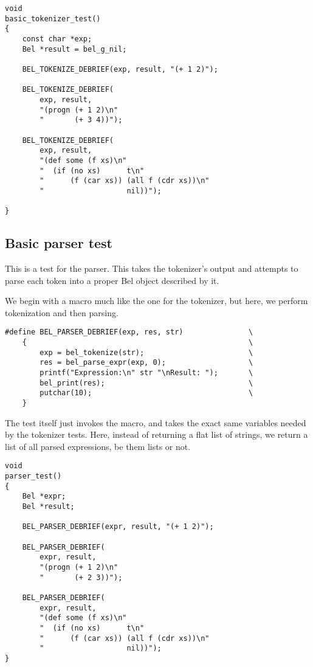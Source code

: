 \documentclass[openright,a4paper,twoside,12pt]{memoir}
\begin{document}
\begin{verbatim}
void
basic_tokenizer_test()
{
    const char *exp;
    Bel *result = bel_g_nil;

    BEL_TOKENIZE_DEBRIEF(exp, result, "(+ 1 2)");

    BEL_TOKENIZE_DEBRIEF(
        exp, result,
        "(progn (+ 1 2)\n"
        "       (+ 3 4))");

    BEL_TOKENIZE_DEBRIEF(
        exp, result,
        "(def some (f xs)\n"
        "  (if (no xs)      t\n"
        "      (f (car xs)) (all f (cdr xs))\n"
        "                   nil))");

}
\end{verbatim}

\subsection{Basic parser test}
\label{sec:orgd0c7366}

This is a  test for the parser. This takes  the tokenizer's output and
attempts to  parse each token  into a  proper Bel object  described by
it.

We begin with a  macro much like the one for  the tokenizer, but here,
we perform tokenization and then parsing.

\begin{verbatim}
#define BEL_PARSER_DEBRIEF(exp, res, str)               \
    {                                                   \
        exp = bel_tokenize(str);                        \
        res = bel_parse_expr(exp, 0);                   \
        printf("Expression:\n" str "\nResult: ");       \
        bel_print(res);                                 \
        putchar(10);                                    \
    }
\end{verbatim}

The  test itself  just invokes  the macro,  and takes  the exact  same
variables needed by the tokenizer  tests. Here, instead of returning a
flat list of  strings, we return a list of  all parsed expressions, be
them lists or not.

\begin{verbatim}
void
parser_test()
{
    Bel *expr;
    Bel *result;
    
    BEL_PARSER_DEBRIEF(expr, result, "(+ 1 2)");

    BEL_PARSER_DEBRIEF(
        expr, result,
        "(progn (+ 1 2)\n"
        "       (+ 2 3))");

    BEL_PARSER_DEBRIEF(
        expr, result,
        "(def some (f xs)\n"
        "  (if (no xs)      t\n"
        "      (f (car xs)) (all f (cdr xs))\n"
        "                   nil))");
}
\end{verbatim}
\end{document}
